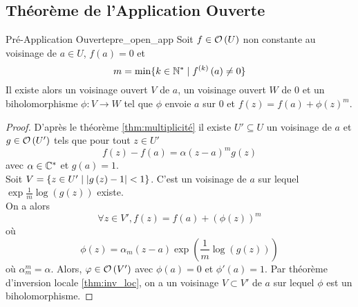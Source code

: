 \documentclass{cours}
\begin{document}
\subsection{Théorème de l'Application Ouverte}
\begin{théorème}{Pré-Application Ouverte}{pre_open_app}
    Soit $f \in \mathcal{O}\left(U\right)$ non constante au voisinage de $a \in U$, $f\left(a\right) = 0$ et \begin{equation*}m = \min\{k \in \mathbb{N}^{*}\mid f^{\left(k\right)}\left(a\right) \neq 0\}\end{equation*}
    Il existe alors un voisinage ouvert $V$ de $a$, un voisinage ouvert $W$ de $0$ et un biholomorphisme $\phi : V\to W$ tel que $\phi$ envoie $a$ sur $0$ et $f\left(z\right) = f\left(a\right) + \phi\left(z\right)^{m}$.
\end{théorème}
\begin{proof}
    D'après le théorème \ref{thm:multiplicité} il existe $U'\subseteq U$ un voisinage de $a$ et $g\in \mathcal{O}\left(U'\right)$ tels que pour tout $z \in U'$
    \begin{equation*}
        f\left(z\right) - f\left(a\right) = \alpha\left(z - a\right)^{m}g\left(z\right)
    \end{equation*}
    avec $\alpha \in \mathbb{C}^{*}$ et $g\left(a\right) = 1$.\\
    Soit $ V = \left\{z \in U'\mid \left|g\left(z\right) - 1\right| < 1\right\}$. C'est un voisinage de $a$ sur lequel $\exp \frac{1}{m}\log\left(g\left(z\right)\right)$ existe.\\
    On a alors
    \begin{equation*}
        \forall z \in V', f\left(z\right) = f\left(a\right) + \left(\phi\left(z\right)\right)^{m}
    \end{equation*}
    où 
    \begin{equation*}
        \phi\left(z\right) = \alpha_{m}\left(z - a\right)\exp\left(\frac{1}{m}\log\left(g\left(z\right)\right)\right)
    \end{equation*}
    où $\alpha_{m}^{m} = \alpha$. Alors, $\varphi \in \mathcal{O}\left(V'\right)$ avec $\phi\left(a\right) = 0$ et $\phi'\left(a\right) = 1$. Par théorème d'inversion locale \ref{thm:inv_loc}, on a un voisinage $V \subset V'$ de $a$ sur lequel $\phi$ est un biholomorphisme.
\end{proof}
\end{document}
